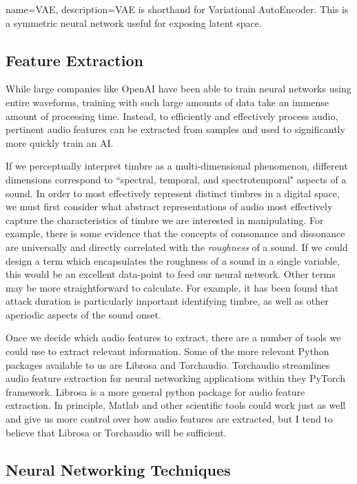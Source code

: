\documentclass{article}
\begin{document}
{
        name=VAE,
        description={VAE is shorthand for Variational AutoEncoder. This is a symmetric neural network useful for exposing latent space.}
}

\subsection{Feature Extraction}

While large companies like OpenAI have been able to train neural networks using entire waveforms, training with such large amounts of data take an immense amount of processing time. \cite{Dhariwal2020} Instead, to efficiently and effectively process audio, pertinent audio features can be extracted from samples and used to significantly more quickly train an AI.

If we perceptually interpret timbre as a multi-dimensional phenomenon, different dimensions correspond to ``spectral, temporal, and spectrotemporal" aspects of a sound. \cite{McAdams2019} In order to most effectively represent distinct timbres in a digital space, we must first consider what abstract representations of audio most effectively capture the characteristics of timbre we are interested in manipulating. 
For example, there is some evidence that the concepts of consonance and dissonance are universally and directly correlated with the \textit{roughness} of a sound. \cite{Milne2023} If we could design a term which encapsulates the roughness of a sound in a single variable, this would be an excellent data-point to feed our neural network. Other terms may be more straightforward to calculate. For example, it has been found that attack duration is particularly important identifying timbre, as well as other aperiodic aspects of the sound onset. \cite{Kai2019}

Once we decide which audio features to extract, there are a number of tools we could use to extract relevant information. Some of the more relevant Python packages available to us are Librosa and Torchaudio. Torchaudio streamlines audio feature extraction for neural networking applications within they PyTorch framework. \cite{Yang2021} Librosa is a more general python package for audio feature extraction. \cite{McFee2015} In principle, Matlab and other scientific tools could work just as well and give us more control over how audio features are extracted, but I tend to believe that Librosa or Torchaudio will be sufficient.


\subsection{Neural Networking Techniques}
\end{document}
